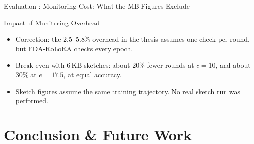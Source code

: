\documentclass[aspectratio=169]{beamer}
\begin{document}
\begin{frame}{Evaluation : Monitoring Cost: What the MB Figures Exclude}
    \vspace{-0.3em}
    \centering
    
    \vspace{0.8em}
    \begin{block}{Impact of Monitoring Overhead}
        \small
        \begin{itemize}
            \item Correction: the 2.5--5.8\% overhead in the thesis assumes one check per round, but FDA-RoLoRA checks every epoch.
            \item Break-even with $6\,\text{KB}$ sketches: about $20\%$ fewer rounds at $\bar{e} = 10$, and about $30\%$ at $\bar{e} = 17.5$, at equal accuracy.
            \item Sketch figures assume the same training trajectory. No real sketch run was performed.
        \end{itemize}
    \end{block}
\end{frame}


\section{Conclusion \& Future Work}
\end{document}

